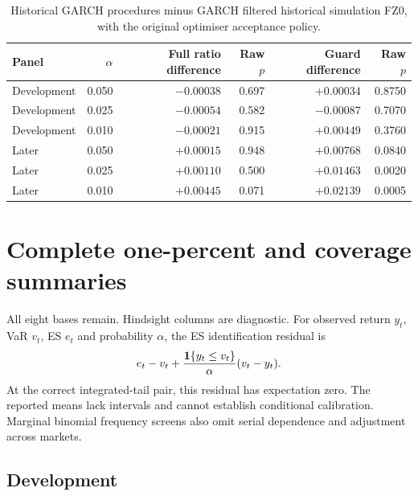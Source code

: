 \begin{table}[htbp]
\centering
\caption[Historical comparisons with filtered historical simulation]{Historical GARCH procedures minus GARCH filtered historical simulation FZ0, with the original optimiser acceptance policy.}
\label{tab:tail-fhs-audit}
\small
\begin{tabular}{lrrrrr}
\toprule
Panel & $\alpha$ & Full ratio difference & Raw $p$ & Guard difference & Raw $p$\\
\midrule
Development & 0.050 & $-0.00038$ & 0.697 & $+0.00034$ & 0.8750\\
Development & 0.025 & $-0.00054$ & 0.582 & $-0.00087$ & 0.7070\\
Development & 0.010 & $-0.00021$ & 0.915 & $+0.00449$ & 0.3760\\
Later & 0.050 & $+0.00015$ & 0.948 & $+0.00768$ & 0.0840\\
Later & 0.025 & $+0.00110$ & 0.500 & $+0.01463$ & 0.0020\\
Later & 0.010 & $+0.00445$ & 0.071 & $+0.02139$ & 0.0005\\
\bottomrule
\end{tabular}
\end{table}

\section{Complete one-percent and coverage summaries}

All eight bases remain. Hindsight columns are diagnostic. For observed return $y_t$, VaR $v_t$, ES $e_t$ and probability $\alpha$, the ES identification residual is
\begin{equation}
 e_t-v_t+\frac{\mathbf{1}\{y_t\leq v_t\}}{\alpha}(v_t-y_t).
 \label{eq:tail-es-residual}
\end{equation}
At the correct integrated-tail pair, this residual has expectation zero. The reported means lack intervals and cannot establish conditional calibration. Marginal binomial frequency screens also omit serial dependence and adjustment across markets.

\subsection{Development}

